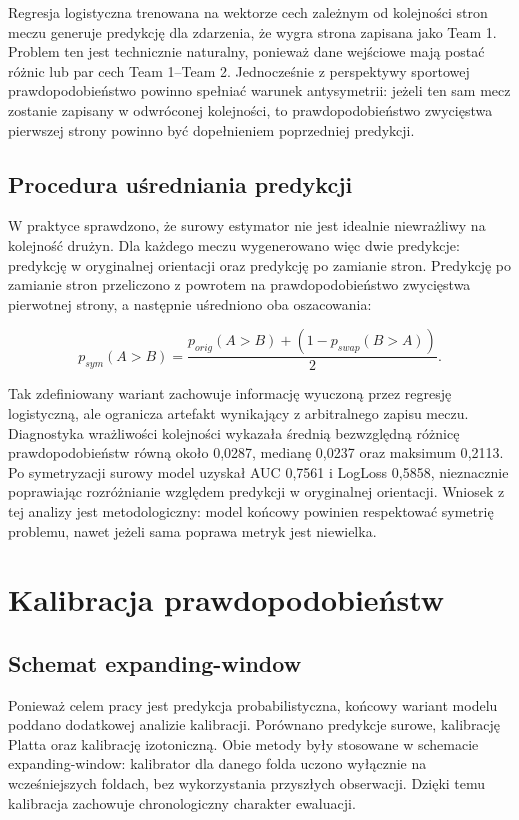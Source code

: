 Regresja logistyczna trenowana na wektorze cech zależnym od kolejności stron meczu generuje
predykcję dla zdarzenia, że wygra strona zapisana jako Team 1. Problem ten jest technicznie
naturalny, ponieważ dane wejściowe mają postać różnic lub par cech Team 1--Team 2. Jednocześnie z
perspektywy sportowej prawdopodobieństwo powinno spełniać warunek antysymetrii: jeżeli ten sam mecz
zostanie zapisany w odwróconej kolejności, to prawdopodobieństwo zwycięstwa pierwszej strony powinno
być dopełnieniem poprzedniej predykcji.

\subsection{Procedura uśredniania predykcji}

W praktyce sprawdzono, że surowy estymator nie jest idealnie niewrażliwy na kolejność drużyn. Dla
każdego meczu wygenerowano więc dwie predykcje: predykcję w oryginalnej orientacji oraz predykcję po
zamianie stron. Predykcję po zamianie stron przeliczono z powrotem na prawdopodobieństwo zwycięstwa
pierwotnej strony, a następnie uśredniono oba oszacowania:

\begin{equation}
    p_{sym}(A>B) = \frac{p_{orig}(A>B) + \left(1 - p_{swap}(B>A)\right)}{2}.
    \label{eq:symmetrized_prediction}
\end{equation}

Tak zdefiniowany wariant zachowuje informację wyuczoną przez regresję logistyczną, ale ogranicza
artefakt wynikający z arbitralnego zapisu meczu. Diagnostyka wrażliwości kolejności wykazała średnią
bezwzględną różnicę prawdopodobieństw równą około 0{,}0287, medianę 0{,}0237 oraz maksimum 0{,}2113.
Po symetryzacji surowy model uzyskał AUC 0{,}7561 i LogLoss 0{,}5858, nieznacznie poprawiając
rozróżnianie względem predykcji w oryginalnej orientacji. Wniosek z tej analizy jest metodologiczny:
model końcowy powinien respektować symetrię problemu, nawet jeżeli sama poprawa metryk jest
niewielka.

\section{Kalibracja prawdopodobieństw}

\subsection{Schemat expanding-window}

Ponieważ celem pracy jest predykcja probabilistyczna, końcowy wariant modelu poddano dodatkowej
analizie kalibracji. Porównano predykcje surowe, kalibrację Platta oraz kalibrację izotoniczną. Obie
metody były stosowane w schemacie expanding-window: kalibrator dla danego folda uczono wyłącznie na
wcześniejszych foldach, bez wykorzystania przyszłych obserwacji. Dzięki temu kalibracja zachowuje
chronologiczny charakter ewaluacji.

